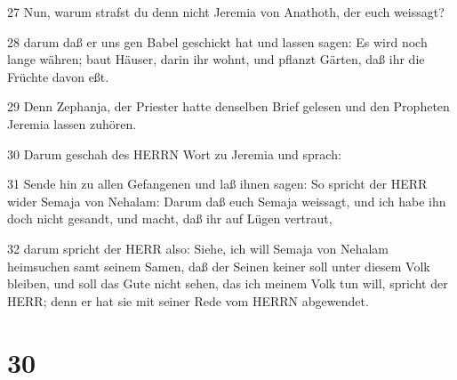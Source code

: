 \par 27 Nun, warum strafst du denn nicht Jeremia von Anathoth, der euch weissagt?
\par 28 darum daß er uns gen Babel geschickt hat und lassen sagen: Es wird noch lange währen; baut Häuser, darin ihr wohnt, und pflanzt Gärten, daß ihr die Früchte davon eßt.
\par 29 Denn Zephanja, der Priester hatte denselben Brief gelesen und den Propheten Jeremia lassen zuhören.
\par 30 Darum geschah des HERRN Wort zu Jeremia und sprach:
\par 31 Sende hin zu allen Gefangenen und laß ihnen sagen: So spricht der HERR wider Semaja von Nehalam: Darum daß euch Semaja weissagt, und ich habe ihn doch nicht gesandt, und macht, daß ihr auf Lügen vertraut,
\par 32 darum spricht der HERR also: Siehe, ich will Semaja von Nehalam heimsuchen samt seinem Samen, daß der Seinen keiner soll unter diesem Volk bleiben, und soll das Gute nicht sehen, das ich meinem Volk tun will, spricht der HERR; denn er hat sie mit seiner Rede vom HERRN abgewendet.

\chapter{30}

